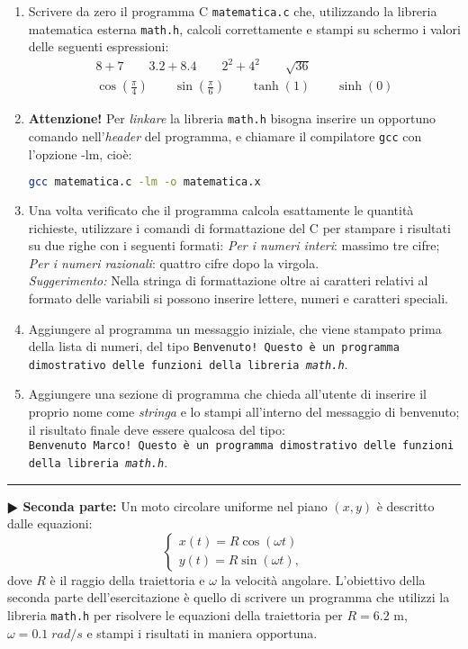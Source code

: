 \documentclass[11pt]{article}
\begin{document}
\begin{enumerate}
\item Scrivere da zero il programma C \texttt{matematica.c} che, utilizzando la libreria matematica esterna \texttt{math.h}, calcoli correttamente e stampi su schermo i valori delle seguenti espressioni:
  \begin{eqnarray*}
    8+7 \qquad  3.2 + 8.4 \qquad 2^2+4^2 \qquad  \sqrt{36}
    \\
    \cos \left(\frac{\pi}{4}\right) \qquad \sin\left(\frac{\pi}{6}\right)
    \qquad
    \tanh\left(1\right) \qquad \sinh\left(0\right)
    \end{eqnarray*}

\item {\bf Attenzione!} Per {\em linkare\/} la libreria \texttt{math.h} bisogna inserire un opportuno comando
nell'{\em header\/} del programma, e chiamare il compilatore \texttt{gcc} con l'opzione -lm, cio\`e:\\
\begin{lstlisting}[language=bash]
  gcc matematica.c -lm -o matematica.x
\end{lstlisting} 
\item Una volta verificato che il programma calcola esattamente le quantit\`a richieste, utilizzare i comandi di formattazione del C per stampare i risultati
  su due righe con i seguenti formati: {\em Per i numeri interi\/}: massimo tre cifre; {\em Per i numeri razionali\/}: quattro cifre dopo la virgola.
  \\
    {\em Suggerimento:\/} Nella stringa di formattazione oltre ai caratteri relativi al formato delle variabili si possono
inserire lettere, numeri e caratteri speciali.
    
\item Aggiungere al programma un messaggio iniziale, che viene stampato prima della lista di numeri, del tipo \texttt{Benvenuto! Questo \`e un programma dimostrativo delle funzioni della libreria {\em math.h}}.
\item Aggiungere una sezione di programma che chieda all'utente di inserire il proprio nome come {\em stringa\/}
e lo stampi all'interno del messaggio di benvenuto; il risultato finale deve essere qualcosa del tipo:\\
\texttt{Benvenuto Marco! Questo \`e un programma dimostrativo delle funzioni della libreria {\em math.h}}.
\end{enumerate}

\hrule
\vspace{1mm}
\textbf{$\RHD$ Seconda parte:} 
Un moto circolare uniforme nel piano $(x,y)$ \`e descritto dalle equazioni:
\[
\left\{ \begin{array}{ll} 
x(t) = R \cos \left(\omega t \right)
\\ 
y(t) = R \sin \left(\omega t \right),
\end{array}
\right.
\]
dove $R$ \`e il raggio della traiettoria e $\omega$ la velocit\`a angolare.
L'obiettivo della seconda parte dell'esercitazione \`e quello di scrivere un programma che utilizzi la libreria \texttt{math.h}
per risolvere le equazioni della traiettoria per $R=6.2$ m, $\omega=0.1 \; rad/s$ e stampi i risultati in maniera opportuna.
\end{document}
